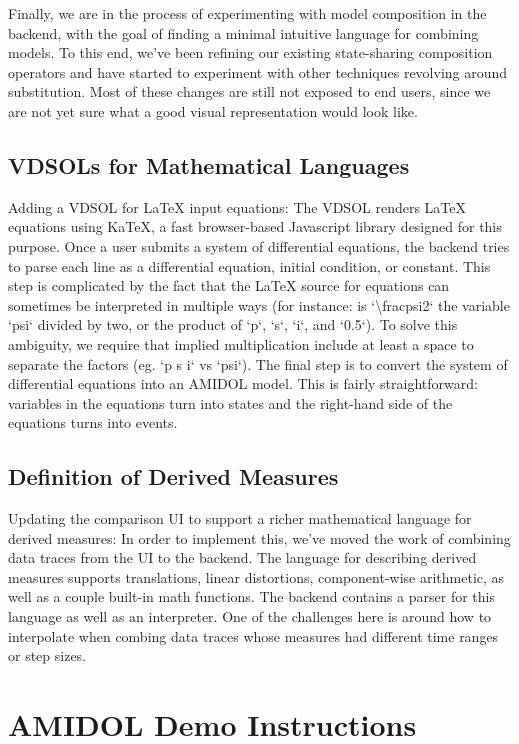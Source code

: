 \documentclass[12pt]{galois-whitepaper}
\begin{document}
Finally, we are in the process of experimenting with model composition in the backend, with the goal of finding a minimal intuitive language for combining models. To this end, we’ve been refining our existing state-sharing composition operators and have started to experiment with other techniques revolving around substitution. Most of these changes are still not exposed to end users, since we are not yet sure what a good visual representation would look like.

\subsection{VDSOLs for Mathematical Languages}

Adding a VDSOL for LaTeX input equations: The VDSOL renders LaTeX
equations using KaTeX, a fast browser-based Javascript library
designed for this purpose. Once a user submits a system of
differential equations, the backend tries to parse each line as a
differential equation, initial condition, or constant. This step is
complicated by the fact that the LaTeX source for equations can
sometimes be interpreted in multiple ways (for instance: is
`\textbackslash frac{psi}{2}` the variable `psi` divided by two, or the product of `p`, `s`, `i`, and `0.5`). To solve this ambiguity, we require that implied multiplication include at least a space to separate the factors (eg. `p s i` vs `psi`). The final step is to convert the system of differential equations into an AMIDOL model. This is fairly straightforward: variables in the equations turn into states and the right-hand side of the equations turns into events.

\subsection{Definition of Derived Measures}

Updating the comparison UI to support a richer mathematical language for derived measures:  In order to implement this, we’ve moved the work of combining data traces from the UI to the backend. The language for describing derived measures supports translations, linear distortions, component-wise arithmetic, as well as a couple built-in math functions. The backend contains a parser for this language as well as an interpreter. One of the challenges here is around how to interpolate when combing data traces whose measures had different time ranges or step sizes.

\section{AMIDOL Demo Instructions}
\end{document}
